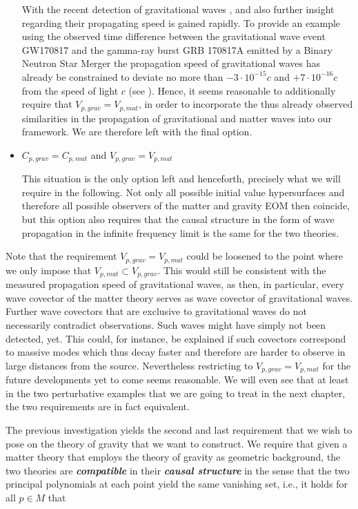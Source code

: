 \begin{itemize}
With the recent detection of gravitational waves \cite{2017ApJ...848L..12A}, \cite{2017PhRvL.119n1101A} and \cite{2016PhRvL.116f1102A} also further insight regarding their propagating speed is gained rapidly. 
To provide an example using the observed time difference between the gravitational wave event GW170817 and the gamma-ray burst GRB 170817A emitted by a Binary Neutron Star Merger the propagation speed of gravitational waves has already be constrained to deviate no more than $-3\cdot 10^{{-}15}c$ and $+7\cdot 10^{{-}16}c$ from the speed of light $c$ (see \cite{2017ApJ...848L..13A}). Hence, it seems reasonable to additionally require that $V_{p,grav} = V_{p,mat}$, in order to incorporate the thus already observed similarities in the propagation of gravitational and matter waves into our framework. We are therefore left with the final option.
\item $C_{p,grav} = C_{p,mat}$ and $V_{p,grav} = V_{p,mat}$ 

This situation is the only option left and henceforth, precisely what we will require in the following. Not only all possible initial value hypersurfaces and therefore all possible observers of the matter and gravity EOM then coincide, but this option also requires that the causal structure in the form of wave propagation in the infinite frequency limit is the same for the two theories.  
\end{itemize}
\begin{remark}
Note that the requirement $V_{p,grav} = V_{p,mat}$ could be loosened to the point where we only impose that $V_{p,mat} \subset V_{p,grav}$. This would still be consistent with the measured propagation speed of gravitational waves, as then, in particular, every wave covector of the matter theory serves as wave covector of gravitational waves. Further wave covectors that are exclusive to gravitational waves do not necessarily contradict observations. Such waves might have simply not been detected, yet. This could, for instance, be explained if such covectors correspond to massive modes which thus decay faster and therefore are harder to observe in large distances from the source. Nevertheless restricting to $V_{p,grav} = V_{p,mat}$ for the future developments yet to come seems reasonable.
We will even see that at least in the two perturbative examples that we are going to treat in the next chapter, the two requirements are in fact equivalent.
\end{remark}
The previous investigation yields the second and last requirement that we wish to pose on the theory of gravity that we want to construct. We require that given a matter theory that employs the theory of gravity as geometric background, the two theories are \textit{\textbf{compatible}} in their \textit{\textbf{causal structure}} in the sense that the two principal polynomials at each point yield the same vanishing set, i.e., it holds for all $p \in M$ that

